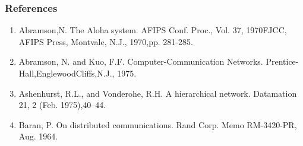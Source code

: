 \subsubsection*{References}
\begin{enumerate}
	\item Abramson,N. The Aloha system. AFIPS Conf. Proc., Vol. 37, 1970FJCC, AFIPS Press, Montvale, N.J., 1970,pp. 281-285.
	
	\item	 Abramson, N. and Kuo, F.F. Computer-Communication Networks. Prentice-Hall,EnglewoodCliffs,N.J., 1975.

	\item	Ashenhurst, R.L., and Vonderohe, R.H. A hierarchical network. Datamation 21, 2 (Feb. 1975),40--44.

	\item	Baran, P. On distributed communications. Rand Corp. Memo RM-3420-PR, Aug. 1964.


\end{enumerate}
